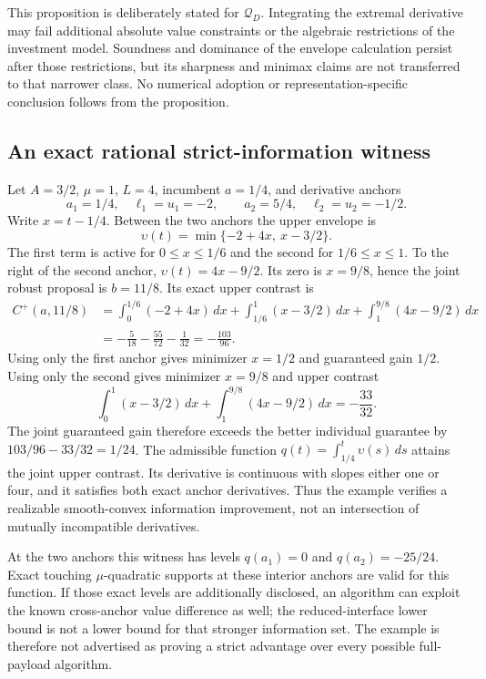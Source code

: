 This proposition is deliberately stated for $\mathcal Q_D$.
Integrating the extremal derivative may fail additional absolute
value constraints or the algebraic restrictions of the investment
model. Soundness and dominance of the envelope calculation persist
after those restrictions, but its sharpness and minimax claims
are not transferred to that narrower class. No numerical adoption
or representation-specific conclusion follows from the proposition.

\subsection{An exact rational strict-information witness}
\label{supp:memorywitness123}

Let $A=3/2$, $\mu=1$, $L=4$, incumbent $a=1/4$, and derivative
anchors
\[
 a_1=1/4,\quad \ell_1=u_1=-2,
 \qquad a_2=5/4,\quad\ell_2=u_2=-1/2.
\]
Write $x=t-1/4$. Between the two anchors the upper envelope is
\[
 \upsilon(t)=\min\{-2+4x,\ x-3/2\}.
\]
The first term is active for $0\le x\le1/6$ and the second
for $1/6\le x\le1$. To the right of the second anchor,
$\upsilon(t)=4x-9/2$. Its zero is $x=9/8$, hence the joint
robust proposal is $b=11/8$. Its exact upper contrast is
\begin{align*}
 C^+(a,11/8)
 &=\int_0^{1/6}(-2+4x)\,dx
   +\int_{1/6}^{1}(x-3/2)\,dx
   +\int_1^{9/8}(4x-9/2)\,dx\\
 &=-\frac5{18}-\frac{55}{72}-\frac1{32}
  =-\frac{103}{96}.
\end{align*}
Using only the first anchor gives minimizer $x=1/2$ and guaranteed
gain $1/2$. Using only the second gives minimizer $x=9/8$ and
upper contrast
\[
 \int_0^1(x-3/2)\,dx+
 \int_1^{9/8}(4x-9/2)\,dx=-\frac{33}{32}.
\]
The joint guaranteed gain therefore exceeds the better individual
guarantee by $103/96-33/32=1/24$. The admissible function
$q(t)=\int_{1/4}^t\upsilon(s)\,ds$ attains the joint upper
contrast. Its derivative is continuous with slopes either one
or four, and it satisfies both exact anchor derivatives.
Thus the example verifies a realizable smooth-convex information
improvement, not an intersection of mutually incompatible derivatives.

At the two anchors this witness has levels $q(a_1)=0$ and
$q(a_2)=-25/24$. Exact touching $\mu$-quadratic supports at these
interior anchors are valid for this function. If those exact
levels are additionally disclosed, an algorithm can exploit the
known cross-anchor value difference as well; the reduced-interface
lower bound is not a lower bound for that stronger information
set. The example is therefore not advertised as proving a strict
advantage over every possible full-payload algorithm.

